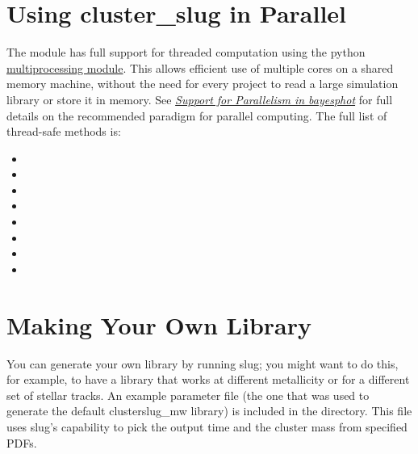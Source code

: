 \documentclass[letterpaper,10pt,english]{sphinxmanual}
\begin{document}
\section{Using cluster\_slug in Parallel}
\label{cluster_slug:using-cluster-slug-in-parallel}
The  module has full support for threaded computation using the python \href{https://docs.python.org/2.7/library/multiprocessing.html}{multiprocessing module}. This allows efficient use of multiple cores on a shared memory machine, without the need for every project to read a large simulation library or store it in memory. See {\hyperref[bayesphot:ssec\string-bayesphot\string-threading]{\emph{Support for Parallelism in bayesphot}}} for full details on the recommended paradigm for parallel computing. The full list of thread-safe  methods is:
\begin{itemize}
\item {} 

\item {} 

\item {} 

\item {} 

\item {} 

\item {} 

\item {} 

\item {} 

\end{itemize}


\section{Making Your Own Library}
\label{cluster_slug:making-your-own-library}
You can generate your own library by running slug; you might want to do this, for example, to have a library that works at different metallicity or for a different set of stellar tracks. An example parameter file (the one that was used to generate the default clusterslug\_mw library) is included in the  directory. This file uses slug's capability to pick the output time and the cluster mass from specified PDFs.
\end{document}

